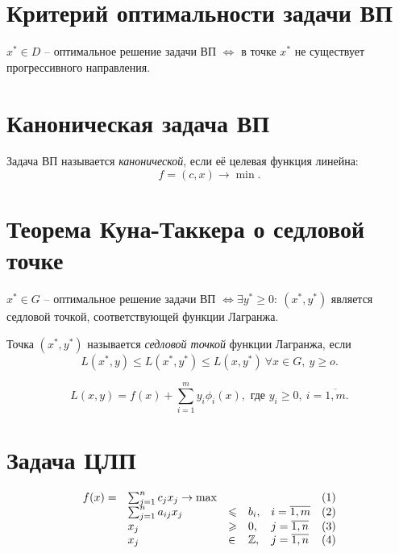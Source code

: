 \section{Критерий оптимальности задачи ВП}

\begin{theorem}
	$x^* \in D$ -- оптимальное решение задачи ВП $\iff $ в точке $x^*$ не существует прогрессивного направления.
\end{theorem}

\section{Каноническая задача ВП}

\begin{definition}
	Задача ВП называется \emph{канонической}, если её целевая функция линейна:
	\[
		f = (c,x) \rightarrow \min.
	\]
\end{definition}

\section{Теорема Куна-Таккера о седловой точке}

\begin{theorem}
	$x^* \in G$ -- оптимальное решение задачи ВП $\iff \exists y^* \geqslant 0: \ (x^*,y^*)$ является седловой точкой, соответствующей функции Лагранжа.
\end{theorem}

\begin{definition}
	Точка $(x^*,y^*)$ называется \emph{седловой точкой} функции Лагранжа, если
	\[
		L(x^*,y) \leqslant L(x^*,y^*) \leqslant L(x,y^*) \ \forall x \in G, \ y \geqslant o.
	\]
\end{definition}

\begin{definition}
	\[
		L(x,y) = f(x) + \sum_{i=1}^{m}y_i \phi_i(x), \text{ где }y_i \geqslant 0, \ i = \overline{1,m}.
	\]
\end{definition}

\setcounter{section}{12}
\section{Задача ЦЛП}

\[
	\begin{array}{lllllr}
		f(x) = & \sum_{j=1}^{n}c_jx_j \rightarrow \max &           &      &                    & (1) \\
		       & \sum_{j=1}^{n}a_{ij}x_j               & \leqslant & b_i, & i = \overline{1,m} & (2) \\
		       & x_j                                   & \geqslant & 0,   & j = \overline{1,n} & (3) \\
		       & x_j                                   & \in       & \mathbb{Z},  & j = \overline{1,n} & (4)
	\end{array}
\]


